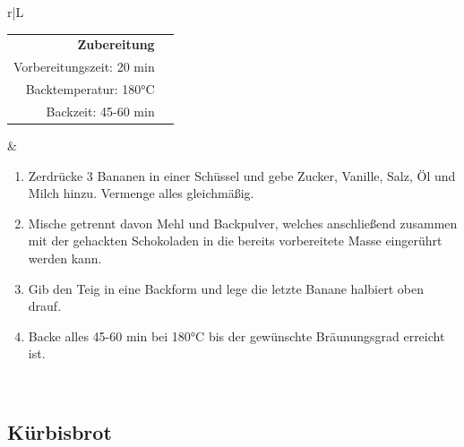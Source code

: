 \documentclass[a4paper, 12pt]{scrbook} 								%
\numberwithin{equation}{section} 									%
\begin{document}
\begin{tabularx}{\textwidth}{r|L}
			\begin{tabular}[t]{rr}
				\textbf{Zubereitung}	\\
				Vorbereitungszeit: 20 min	\\
				Backtemperatur: 180°C \\
				Backzeit:	45-60 min	\\
			\end{tabular}			&	\begin{enumerate}[]
											\item Zerdrücke 3 Bananen in einer Schüssel und gebe Zucker, Vanille, Salz, Öl und Milch hinzu. Vermenge alles gleichmäßig.
											\item Mische getrennt davon Mehl und Backpulver, welches anschließend zusammen mit der gehackten Schokoladen in die bereits vorbereitete Masse eingerührt werden kann.
											\item Gib den Teig in eine Backform und lege die letzte Banane halbiert oben drauf.
											\item Backe alles 45-60 min bei 180°C bis der gewünschte Bräunungsgrad erreicht ist.
										\end{enumerate}	\\
		\end{tabularx}
		\newpage

		


		\subsection{Kürbisbrot}

\end{document}
